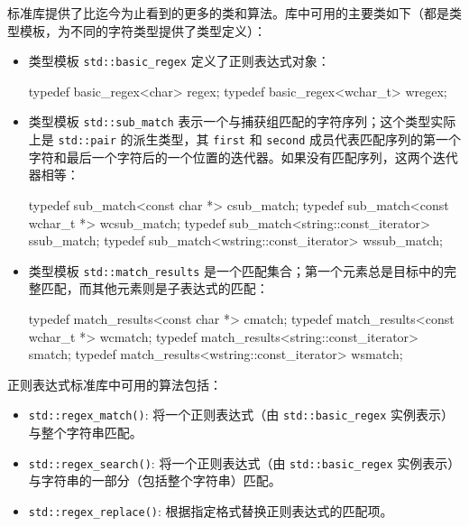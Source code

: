 标准库提供了比迄今为止看到的更多的类和算法。库中可用的主要类如下（都是类型模板，为不同的字符类型提供了类型定义）：

\begin{itemize}
\item
类型模板 \verb|std::basic_regex| 定义了正则表达式对象：

\begin{cpp}
typedef basic_regex<char>    regex;
typedef basic_regex<wchar_t> wregex;
\end{cpp}

\item
类型模板 \verb|std::sub_match| 表示一个与捕获组匹配的字符序列；这个类型实际上是 \verb|std::pair| 的派生类型，其 \verb|first| 和 \verb|second| 成员代表匹配序列的第一个字符和最后一个字符后的一个位置的迭代器。如果没有匹配序列，这两个迭代器相等：

\begin{cpp}
typedef sub_match<const char *>            csub_match;
typedef sub_match<const wchar_t *>         wcsub_match;
typedef sub_match<string::const_iterator>  ssub_match;
typedef sub_match<wstring::const_iterator> wssub_match;
\end{cpp}

\item
类型模板 \verb|std::match_results| 是一个匹配集合；第一个元素总是目标中的完整匹配，而其他元素则是子表达式的匹配：

\begin{cpp}
typedef match_results<const char *>            cmatch;
typedef match_results<const wchar_t *>         wcmatch;
typedef match_results<string::const_iterator>  smatch;
typedef match_results<wstring::const_iterator> wsmatch;
\end{cpp}
\end{itemize}

正则表达式标准库中可用的算法包括：

\begin{itemize}
\item
\verb|std::regex_match()|: 将一个正则表达式（由 \verb|std::basic_regex| 实例表示）与整个字符串匹配。

\item
\verb|std::regex_search()|: 将一个正则表达式（由 \verb|std::basic_regex| 实例表示）与字符串的一部分（包括整个字符串）匹配。

\item
\verb|std::regex_replace()|: 根据指定格式替换正则表达式的匹配项。
\end{itemize}

